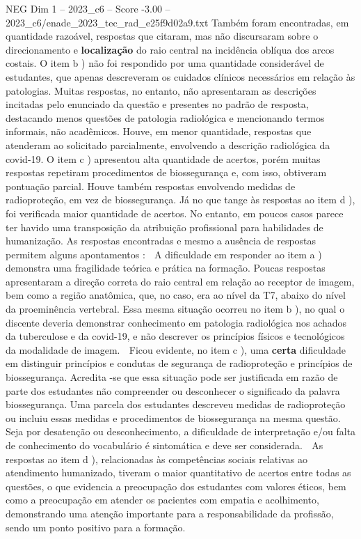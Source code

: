 \begin{textsample}{NEG Dim 1 – 2023\_c6 – Score -3.00 – 2023\_c6/enade\_2023\_tec\_rad\_e25f9d02a9.txt}
Também foram encontradas, em quantidade razoável, respostas que citaram, mas não discursaram sobre o direcionamento e \textbf{localização} do raio central na incidência oblíqua dos arcos costais.
O item b ) não foi respondido por uma quantidade considerável de estudantes, que apenas descreveram os cuidados clínicos necessários em relação às patologias.
Muitas respostas, no entanto, não apresentaram as descrições incitadas pelo enunciado da questão e presentes no padrão de resposta, destacando menos questões de patologia radiológica e mencionando termos informais, não acadêmicos.
Houve, em menor quantidade, respostas que atenderam ao solicitado parcialmente, envolvendo a descrição radiológica da covid-19.
O item c ) apresentou alta quantidade de acertos, porém muitas respostas repetiram procedimentos de biossegurança e, com isso, obtiveram pontuação parcial.
Houve também respostas envolvendo medidas de radioproteção, em vez de biossegurança.
Já no que tange às respostas ao item d ), foi verificada maior quantidade de acertos.
No entanto, em poucos casos parece ter havido uma transposição da atribuição profissional para habilidades de humanização.
As respostas encontradas e mesmo a ausência de respostas permitem alguns apontamentos :  A dificuldade em responder ao item a ) demonstra uma fragilidade teórica e prática na formação.
Poucas respostas apresentaram a direção correta do raio central em relação ao receptor de imagem, bem como a região anatômica, que, no caso, era ao nível da T7, abaixo do nível da proeminência vertebral.
Essa mesma situação ocorreu no item b ), no qual o discente deveria demonstrar conhecimento em patologia radiológica nos achados da tuberculose e da covid-19, e não descrever os princípios físicos e tecnológicos da modalidade de imagem.  Ficou evidente, no item c ), uma \textbf{certa} dificuldade em distinguir princípios e condutas de segurança de radioproteção e princípios de biossegurança.
Acredita -se que essa situação pode ser justificada em razão de parte dos estudantes não compreender ou desconhecer o significado da palavra biossegurança.
Uma parcela dos estudantes descreveu medidas de radioproteção ou incluiu essas medidas e procedimentos de biossegurança na mesma questão.
Seja por desatenção ou desconhecimento, a dificuldade de interpretação e/ou falta de conhecimento do vocabulário é sintomática e deve ser considerada.  As respostas ao item d ), relacionadas às competências sociais relativas ao atendimento humanizado, tiveram o maior quantitativo de acertos entre todas as questões, o que evidencia a preocupação dos estudantes com valores éticos, bem como a preocupação em atender os pacientes com empatia e acolhimento, demonstrando uma atenção importante para a responsabilidade da profissão, sendo um ponto positivo para a formação.

\end{textsample}
